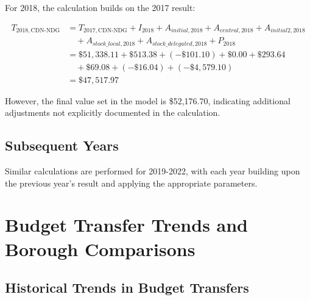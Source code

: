 \documentclass{article}
\begin{document}
For 2018, the calculation builds on the 2017 result:

\begin{equation}
\begin{aligned}
T_{2018,\text{CDN-NDG}} &= T_{2017,\text{CDN-NDG}} + I_{2018} + A_{initial,2018} + A_{central,2018} + A_{initial2,2018} \\
&\quad + A_{stock\_local,2018} + A_{stock\_delegated,2018} + P_{2018} \\
&= \$51,338.11 + \$513.38 + (-\$101.10) + \$0.00 + \$293.64 \\
&\quad + \$69.08 + (-\$16.04) + (-\$4,579.10) \\
&= \$47,517.97
\end{aligned}
\end{equation}

However, the final value set in the model is \$52,176.70, indicating additional adjustments not explicitly documented in the calculation.

\subsection{Subsequent Years}

Similar calculations are performed for 2019-2022, with each year building upon the previous year's result and applying the appropriate parameters.

\section{Budget Transfer Trends and Borough Comparisons}

\subsection{Historical Trends in Budget Transfers}
\end{document}
